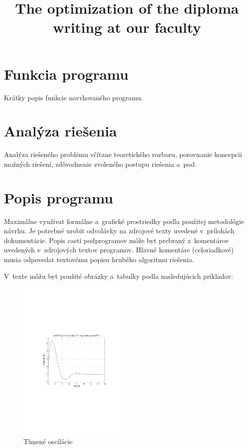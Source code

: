 \documentclass[a4paper]{feidipsp}
\title{The optimization of the diploma writing at our faculty}
\begin{document}


\titulnastrana

\tableofcontents

\newpage

\setcounter{page}{1}

\section{Funkcia programu}

Krátky popis funkcie navrhovaného programu.

\section{Analýza riešenia}

Analýza riešeného problému včítane teoretického rozboru, porovnanie koncepcii možných
riešení, zdôvodnenie zvoleného postupu riešenia a~pod.

\section{Popis programu}

Maximálne využívat formálne a~grafické prostriedky podla použitej metodológie návrhu.
Je potrebné urobit odvolávky na zdrojové texty uvedené v~prílohách dokumentácie. Popis
castí podprogramov môže byt prebraný  z~komentárov uvedených v~zdrojových textov
programov. Hlavné komentáre (celoriadkové) musia odpovedat textovému popisu hrubého 
algoritmu riešenia.

V~texte môžu byt použité obrázky a~tabulky podla nasledujúcich príkladov:

\begin{figure}[!ht]
\centering 
\includegraphics[width=0.5\textwidth]{tlmosc}
\caption{Tlmené oscilácie}\label{o:1}
\end{figure}
\end{document}
